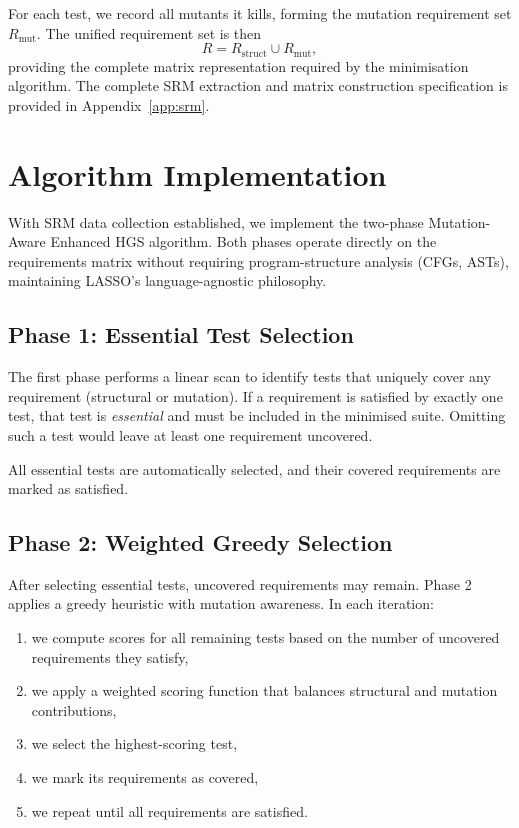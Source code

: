 For each test, we record all mutants it kills, forming the mutation requirement set $R_{\text{mut}}$. The unified requirement set is then
\[
R = R_{\text{struct}} \cup R_{\text{mut}},
\]
providing the complete matrix representation required by the minimisation algorithm. The complete SRM extraction and matrix construction specification is provided in Appendix~\ref{app:srm}.

\section{Algorithm Implementation}

With SRM data collection established, we implement the two-phase Mutation-Aware Enhanced HGS algorithm. Both phases operate directly on the requirements matrix without requiring program-structure analysis (CFGs, ASTs), maintaining LASSO's language-agnostic philosophy.

\subsection{Phase 1: Essential Test Selection}

The first phase performs a linear scan to identify tests that uniquely cover any requirement (structural or mutation). If a requirement is satisfied by exactly one test, that test is \emph{essential} and must be included in the minimised suite. Omitting such a test would leave at least one requirement uncovered.

All essential tests are automatically selected, and their covered requirements are marked as satisfied.

\subsection{Phase 2: Weighted Greedy Selection}

After selecting essential tests, uncovered requirements may remain. Phase 2 applies a greedy heuristic with mutation awareness. In each iteration:

\begin{enumerate}
  \item we compute scores for all remaining tests based on the number of uncovered requirements they satisfy,
  \item we apply a weighted scoring function that balances structural and mutation contributions,
  \item we select the highest-scoring test,
  \item we mark its requirements as covered,
  \item we repeat until all requirements are satisfied.
\end{enumerate}

